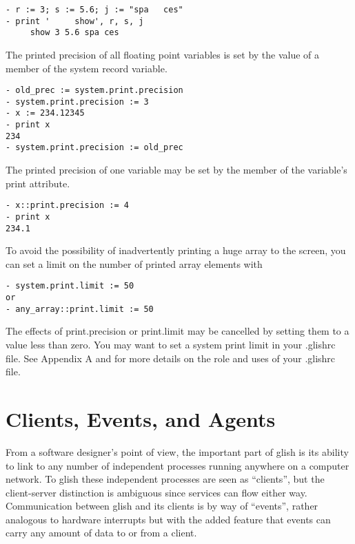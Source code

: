 \begin{verbatim}
- r := 3; s := 5.6; j := "spa   ces"
- print '     show', r, s, j
     show 3 5.6 spa ces
\end{verbatim}

    The printed precision of all floating point variables is set by the
value of a member of the system record variable.

\begin{verbatim}
- old_prec := system.print.precision
- system.print.precision := 3
- x := 234.12345
- print x
234
- system.print.precision := old_prec
\end{verbatim}

    The printed precision of one variable may be set by the member of the
variable's print attribute.

\begin{verbatim}
- x::print.precision := 4
- print x
234.1
\end{verbatim}

    To avoid the possibility of inadvertently printing a huge array to the
screen, you can set a limit on the number of printed array elements with

\begin{verbatim}
- system.print.limit := 50
or
- any_array::print.limit := 50
\end{verbatim}

The effects of print.precision or print.limit may be cancelled by setting
them to a value less than zero.  You may want to set a system print limit
in your .glishrc file.  See
Appendix A and 
for more details on the role and uses of your .glishrc file.


\section{Clients, Events, and Agents}

    From a software designer's point of view, the important part of glish is
its ability to link to any number of independent processes running anywhere
on a computer network.  To glish these independent processes are seen as
``clients'', but the client-server distinction is ambiguous since services can
flow either way.  Communication between glish and its clients is by way of
``events'', rather analogous to hardware interrupts but with the added feature
that events can carry any amount of data to or from a client.

